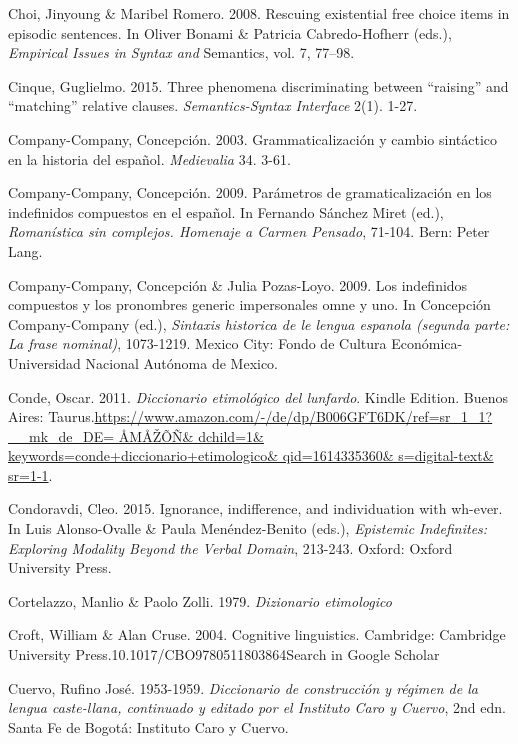 \documentclass[output=paper]{langscibook}
\begin{document}
Choi, Jinyoung \& Maribel Romero. 2008. Rescuing existential free choice items in episodic sentences. In Oliver Bonami \& Patricia Cabredo-Hofherr (eds.), \textit{Empirical Issues in Syntax and} Semantics, vol. 7, 77–98.

Cinque, Guglielmo. 2015. Three phenomena discriminating between “raising” and “matching” relative clauses. \textit{Semantics-Syntax Interface} 2(1). 1-27.

Company-Company, Concepción. 2003. Grammaticalización y cambio sintáctico en la historia del español. \textit{Medievalia} 34. 3-61.

Company-Company, Concepción. 2009. Parámetros de gramaticalización en los indefinidos compuestos en el español. In Fernando Sánchez Miret (ed.), \textit{Romanística sin complejos. Homenaje a Carmen Pensado}, 71-104. Bern: Peter Lang.

Company-Company, Concepción \& Julia Pozas-Loyo. 2009. Los indefinidos compuestos y los pronombres generic impersonales omne y uno. In Concepción Company-Company (ed.), \textit{Sintaxis historica de le lengua espanola (segunda parte: La frase nominal)}, 1073-1219. Mexico City: Fondo de Cultura Económica-Universidad Nacional Autónoma de Mexico.

Conde, Oscar. 2011. \textit{Diccionario etimológico del lunfardo}. Kindle Edition. Buenos Aires: Taurus.\href{https://www.amazon.com/-/de/dp/B006GFT6DK/ref=sr_1_1?__mk_de_DE=%20ÅMÅŽÕÑ & dchild=1 & keywords=conde+diccionario+etimologico & qid=1614335360 & s=digital-text & sr=1-1}{{https://www.amazon.com/-/de/dp/B006GFT6DK/ref=sr\_1\_1?\_\_mk\_de\_DE= ÅMÅŽÕÑ\& dchild=1\& keywords=conde+diccionario+etimologico\& qid=1614335360\& s=digital-text\& sr=1-1}}.

Condoravdi, Cleo. 2015. Ignorance, indifference, and individuation with wh-ever. In Luis Alonso-Ovalle \& Paula Menéndez-Benito (eds.), \textit{Epistemic Indefinites: Exploring Modality Beyond the Verbal Domain}, 213-243. Oxford: Oxford University Press.

Cortelazzo, Manlio \& Paolo Zolli. 1979. \emph{\textmd{\textit{Dizionario etimologico}}}

Croft, William \& Alan Cruse. 2004. Cognitive linguistics. Cambridge: Cambridge University Press.10.1017/CBO9780511803864Search in Google Scholar

Cuervo, Rufino José. 1953-1959. \textit{Diccionario de construcción y régimen de la lengua caste-llana, continuado y editado por el Instituto Caro y Cuervo}, 2nd edn. Santa Fe de Bogotá: Instituto Caro y Cuervo.
\end{document}
